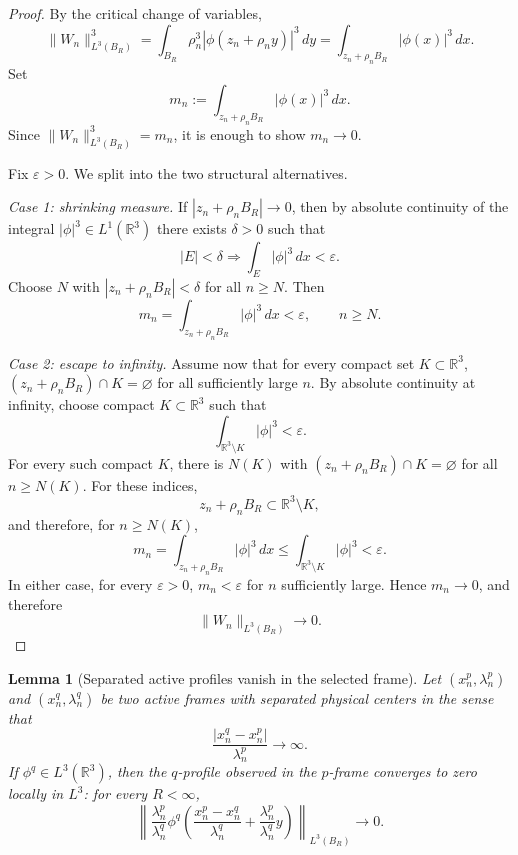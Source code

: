\documentclass[11pt]{amsart}
\theoremstyle{plain}
\newtheorem{lemma}[theorem]{Lemma}
\theoremstyle{definition}
\theoremstyle{remark}
\begin{document}
\begin{proof}
By the critical change of variables,
\[
  \|W_n\|_{L^3(B_R)}^3
  =\int_{B_R}\rho_n^3|\phi(z_n+\rho_n y)|^3\,dy
  =\int_{z_n+\rho_n B_R}|\phi(x)|^3\,dx.
\]
Set
\[
  m_n:=\int_{z_n+\rho_n B_R}|\phi(x)|^3\,dx.
\]
Since \(\|W_n\|_{L^3(B_R)}^3=m_n\), it is enough to show \(m_n\to0\).
\par
Fix \(\varepsilon>0\).  We split into the two structural alternatives.

\smallskip
\noindent\textit{Case 1: shrinking measure.}
If \(|z_n+\rho_nB_R|\to0\), then by absolute continuity of the integral
\(|\phi|^3\in L^1(\mathbb R^3)\) there exists \(\delta>0\) such that
\[
  |E|<\delta\Longrightarrow \int_E|\phi|^3\,dx<\varepsilon.
\]
Choose \(N\) with \(|z_n+\rho_nB_R|<\delta\) for all \(n\ge N\).  Then
\[
  m_n=\int_{z_n+\rho_nB_R}|\phi|^3\,dx<\varepsilon,\qquad n\ge N.
\]

\smallskip
\noindent\textit{Case 2: escape to infinity.}
Assume now that for every compact set \(K\subset\mathbb R^3\),
\((z_n+\rho_nB_R)\cap K=\varnothing\) for all sufficiently large \(n\).  By
absolute continuity at infinity, choose compact \(K\subset\mathbb R^3\) such that
\[
  \int_{\mathbb R^3\setminus K}|\phi|^3<\varepsilon.
\]
For every such compact \(K\), there is \(N(K)\) with
\((z_n+\rho_nB_R)\cap K=\varnothing\) for all \(n\ge N(K)\).  For these
indices,
\[
  z_n+\rho_nB_R \subset \mathbb R^3\setminus K,
\]
and therefore, for \(n\ge N(K)\),
\[
  m_n=\int_{z_n+\rho_nB_R}|\phi|^3\,dx
  \le
  \int_{\mathbb R^3\setminus K}|\phi|^3
  <\varepsilon.
\]
In either case, for every \(\varepsilon>0\), \(m_n<\varepsilon\) for \(n\) sufficiently
large.  Hence \(m_n\to0\), and therefore
\[
  \|W_n\|_{L^3(B_R)}\to0.
\]
\end{proof}

\begin{lemma}[Separated active profiles vanish in the selected frame]\label{lem:separated-vanish}
Let \((x^p_n,\lambda^p_n)\) and \((x^q_n,\lambda^q_n)\) be two active frames
with separated physical centers in the sense that
\[
  \frac{|x^q_n-x^p_n|}{\lambda^p_n}\to\infty.
\]
If \(\phi^q\in L^3(\mathbb R^3)\), then the \(q\)-profile observed in the
\(p\)-frame converges to zero locally in \(L^3\): for every \(R<\infty\),
\[
  \left\|
  \frac{\lambda^p_n}{\lambda^q_n}
  \phi^q\left(\frac{x^p_n-x^q_n}{\lambda^q_n}
       +\frac{\lambda^p_n}{\lambda^q_n}y\right)
  \right\|_{L^3(B_R)}\to0.
\]
\end{lemma}
\end{document}
